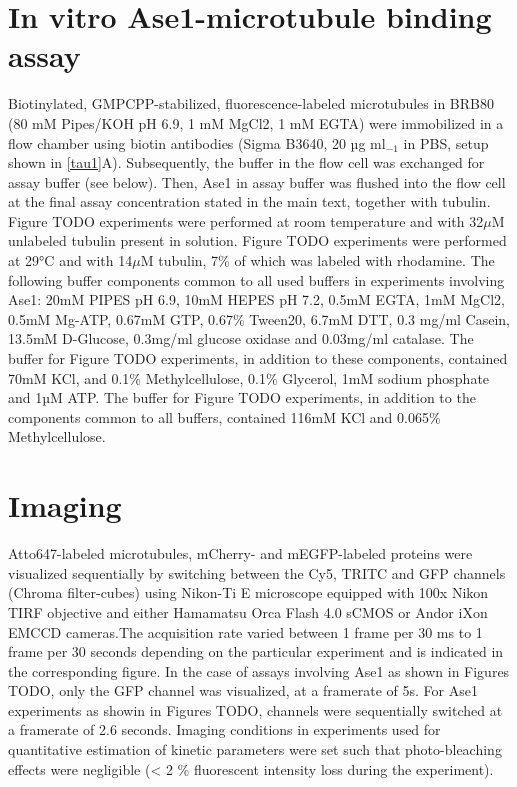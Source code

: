 \section{In vitro Ase1-microtubule binding assay}
Biotinylated, GMPCPP-stabilized, fluorescence-labeled microtubules in BRB80 (80 mM Pipes/KOH pH 6.9, 1 mM MgCl2, 1 mM EGTA) were immobilized in a flow chamber using biotin antibodies (Sigma B3640, 20 µg ml$_{-1}$ in PBS, setup shown in \autoref{tau1}A). Subsequently, the buffer in the flow cell was exchanged for assay buffer (see below). Then, Ase1 in assay buffer was flushed into the flow cell at the final assay concentration stated in the main text, together with tubulin. Figure TODO experiments were performed at room temperature and with 32$\mu$M unlabeled tubulin present in solution. Figure TODO experiments were performed at 29°C and with 14$\mu$M tubulin, 7\% of which was labeled with rhodamine. The following buffer components common to all used buffers in experiments involving Ase1: 20mM PIPES pH 6.9, 10mM HEPES pH 7.2, 0.5mM EGTA, 1mM MgCl2, 0.5mM Mg-ATP, 0.67mM GTP, 0.67\% Tween20, 6.7mM DTT, 0.3 mg/ml Casein, 13.5mM D-Glucose, 0.3mg/ml glucose oxidase and 0.03mg/ml catalase. The buffer for Figure TODO experiments, in addition to these components, contained 70mM KCl, and 0.1\% Methylcellulose, 0.1\% Glycerol, 1mM sodium phosphate and 1µM ATP. The buffer for Figure TODO experiments, in addition to the components common to all buffers, contained 116mM KCl and 0.065\% Methylcellulose.

\section{Imaging}
Atto647-labeled microtubules, mCherry- and mEGFP-labeled proteins were visualized sequentially by switching between the Cy5, TRITC and GFP channels (Chroma filter-cubes) using Nikon-Ti E microscope equipped with 100x Nikon TIRF objective and either Hamamatsu Orca Flash 4.0 sCMOS or Andor iXon EMCCD cameras.The acquisition rate varied between 1 frame per 30 ms to 1 frame per 30 seconds depending on the particular experiment and is indicated in the corresponding figure.  In the case of assays involving Ase1 as shown in Figures TODO, only the GFP channel was visualized, at a framerate of 5s. For Ase1 experiments as showin in Figures TODO, channels were sequentially switched at a framerate of 2.6 seconds. Imaging conditions in experiments used for quantitative estimation of kinetic parameters were set such that photo-bleaching effects were negligible (< 2 \% fluorescent intensity loss during the experiment). 
